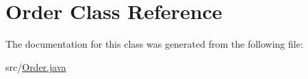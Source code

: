 \hypertarget{classOrder}{\section{Order Class Reference}
\label{classOrder}
}


The documentation for this class was generated from the following file\-:\begin{DoxyCompactItemize}
\item 
src/\hyperlink{Order_8java}{Order.\-java}\end{DoxyCompactItemize}
